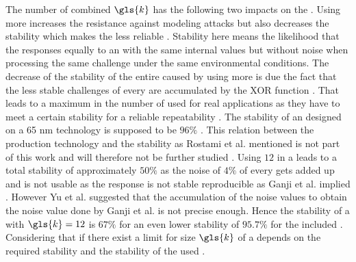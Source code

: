 The number of combined \apufs $\gls{k}$ has the following two impacts on the \puf.
Using more \apufs increases the resistance against modeling attacks but also decreases the stability which makes the \puf less reliable \cite{Becker2015ThePUFs, Ganji2015WhyPUFs}.
Stability here means the likelihood that the \apuf responses equally to an \apuf with the same internal values but without noise when processing the same challenge under the same environmental conditions.
The decrease of the stability of the entire \xpuf caused by using more \apufs is due the fact that the less stable challenges of every \apuf are accumulated by the \ac{XOR} function \cite{Rostami2014RobustMatching}.
That leads to a maximum in the number of used \apufs for real applications as they have to meet a certain stability for a reliable repeatability \cite{Rostami2014RobustMatching}.
The stability of an \apuf designed on a 65 nm technology is supposed to be $96 \%$ \cite{Rostami2014RobustMatching}.
This relation between the production technology and the stability as Rostami et al. mentioned is not part of this work and will therefore not be further studied \cite{Rostami2014RobustMatching}.
Using $12$ \apufs in a \xpuf leads to a total stability of approximately $50 \%$ as the noise of $4 \%$ of every \apuf gets added up and is not usable as the response is not stable reproducible as Ganji et al. implied \cite{Ganji2015WhyPUFs}.
However Yu et al. suggested that the accumulation of the \apuf noise values to obtain the \xpuf noise value done by Ganji et al. is not precise enough. Hence the stability of a \xpuf with $\gls{k} = 12$ is $67 \%$ for an even lower stability of $95.7 \%$ for the included \apufs \cite{Yu2016AAuthentication}.
Considering that if there exist a limit for size $\gls{k}$ of a \xpuf depends on the required stability and the stability of the used \apufs.

